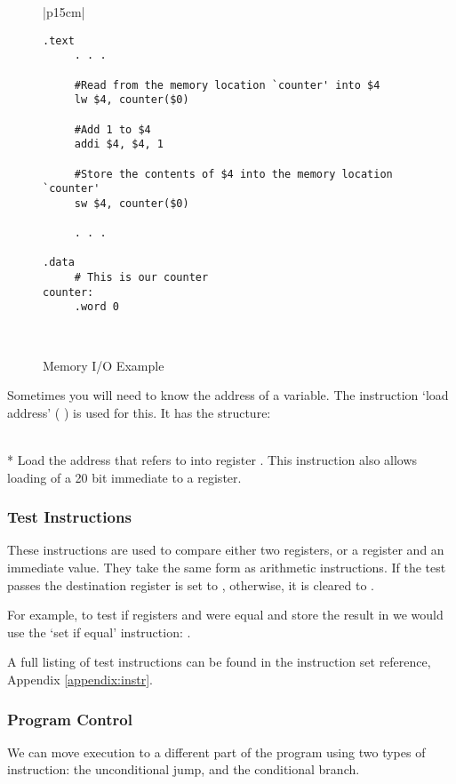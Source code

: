 \begin{figure}[btp]
\begin{center}
\begin{tabular}{|p{15cm}|}
\hline
\begin{verbatim}
.text
     . . .

     #Read from the memory location `counter' into $4
     lw $4, counter($0)

     #Add 1 to $4
     addi $4, $4, 1

     #Store the contents of $4 into the memory location `counter'
     sw $4, counter($0)

     . . .
     
.data
     # This is our counter
counter:
     .word 0 
\end{verbatim}%
\\
\hline
\end{tabular}
\end{center}
\caption{Memory I/O Example}
\label{memio}
\end{figure}

Sometimes you will need to know the address of a variable. The 
instruction `load address' (  ) is used for this. It has the 
structure:

 \\*
Load the address that  refers to into register \regd.
This instruction also allows loading of a 20 bit immediate to a register.

\subsubsection{Test Instructions}
These instructions are used to compare either two registers, or a
register and an immediate value. They take the same form as
arithmetic instructions. If the test passes the destination register
is set to , otherwise, it is cleared to .

For example, to test if registers  and  were equal and store the
result in  we would use the `set if equal' instruction: 
.

A full listing of test instructions can be found in the instruction set reference, Appendix \ref{appendix:instr}.

\subsubsection{Program Control}
We can move execution to a different part of the program using two types
of instruction: the unconditional jump, and the conditional branch.

